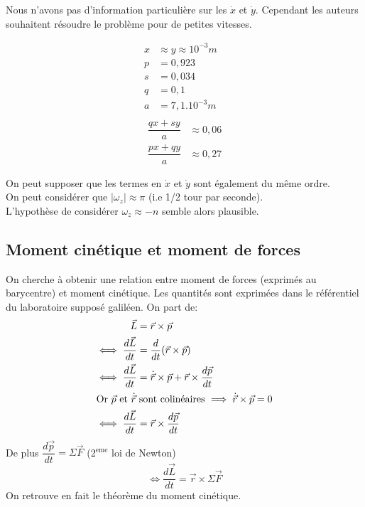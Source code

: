 \documentclass[12pt,a4paper]{article}
\begin{document}
	
	Nous n'avons pas d'information particulière sur les $\dot{x}$ et $\dot{y}$. Cependant les auteurs souhaitent résoudre le problème pour de petites vitesses.
	
	\begin{multicols}{2}
		\noindent
		\begin{align*}
		x&\approx y \approx 10^{-3}m&\\
		p&=0,923&\\
		s&=0,034&\\
		q&=0,1&\\
		a&=7,1.10^{-3}m&\\
		\end{align*}
		\columnbreak
		\begin{align*}
		\dfrac{qx+sy}{a}&\approx0,06\\[2em]
		\dfrac{px+qy}{a}&\approx0,27
		\end{align*}
	\end{multicols}
	\vspace*{-3em}
	On peut supposer que les termes en $\dot{x}$ et $\dot{y}$ sont également du même ordre.\\
	On peut considérer que $|\omega_z|\approx\pi$ (i.e 1/2 tour par seconde).\\
	L'hypothèse de considérer $\omega_z\approx-n$ semble alors plausible.
	
	
	
	\subsection{Moment cinétique et moment de forces}
	\label{subsec:moments}
	On cherche à obtenir une relation entre moment de forces (exprimés au barycentre) et moment cinétique. Les quantités sont exprimées dans le référentiel du laboratoire supposé galiléen.
	On part de:
	\begin{align*}
	\vec{L}     &= \vec{r}\times \vec{p}\\
	\iff\dfrac{d\vec{L}}{dt} &= \dfrac{d}{dt}(\vec{r}\times \vec{p})\\
	\iff\dfrac{d\vec{L}}{dt} &= \dot{\vec{r}}\times \vec{p}+\vec{r}\times \dfrac{d\vec{p}}{dt}\\
	\intertext{Or $\vec{p}$ et $\dot{\vec{r}}$ sont colinéaires $\implies \dot{\vec{r}}\times \vec{p} = 0$}
	\iff\dfrac{d\vec{L}}{dt} &= \vec{r}\times \dfrac{d\vec{p}}{dt}
	\end{align*}
	De plus $\dfrac{d\vec{p}}{dt}=\Sigma\vec{F}$ (2$^{\mathrm{eme}}$ loi de Newton)
	\begin{equation}
	\iff\dfrac{d\vec{L}}{dt} = \vec{r}\times\Sigma\vec{F}
	\end{equation}
	On retrouve en fait le théorème du moment cinétique.
	
\end{document}
